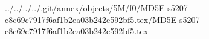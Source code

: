 ../../../../.git/annex/objects/5M/f0/MD5E-s5207--c8c69c7917f6af1b2ea03b242e592bf5.tex/MD5E-s5207--c8c69c7917f6af1b2ea03b242e592bf5.tex